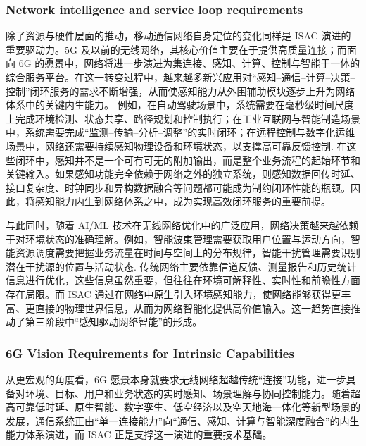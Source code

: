 \subsubsection{Network intelligence and service loop requirements}
\label{subsubsec:ch1-driving-force-network}

除了资源与硬件层面的推动，移动通信网络自身定位的变化同样是 ISAC 演进的重要驱动力。5G 及以前的无线网络，其核心价值主要在于提供高质量连接；而面向 6G 的愿景中，网络将进一步演进为集连接、感知、计算、控制与智能于一体的综合服务平台\cite{Gonzalez2024integrated,Saad2020Vision6G}。在这一转变过程中，越来越多新兴应用对“感知--通信--计算--决策--控制”闭环服务的需求不断增强，从而使感知能力从外围辅助模块逐步上升为网络体系中的关键内生能力。
例如，在自动驾驶场景中，系统需要在毫秒级时间尺度上完成环境检测、状态共享、路径规划和控制执行；在工业互联网与智能制造场景中，系统需要完成“监测--传输--分析--调整”的实时闭环；在远程控制与数字化运维场景中，网络还需要持续感知物理设备和环境状态，以支撑高可靠反馈控制\cite{Liu2022ISAC,Saad2020Vision6G}. 在这些闭环中，感知并不是一个可有可无的附加输出，而是整个业务流程的起始环节和关键输入。如果感知功能完全依赖于网络之外的独立系统，则感知数据回传时延、接口复杂度、时钟同步和异构数据融合等问题都可能成为制约闭环性能的瓶颈。因此，将感知能力内生到网络体系之中，成为实现高效闭环服务的重要前提。

与此同时，随着 AI/ML 技术在无线网络优化中的广泛应用，网络决策越来越依赖于对环境状态的准确理解。例如，智能波束管理需要获取用户位置与运动方向，智能资源调度需要把握业务流量在时间与空间上的分布规律，智能干扰管理需要识别潜在干扰源的位置与活动状态\cite{Saad2020Vision6G}. 传统网络主要依靠信道反馈、测量报告和历史统计信息进行优化，这些信息虽然重要，但往往在环境可解释性、实时性和前瞻性方面存在局限。而 ISAC 通过在网络中原生引入环境感知能力，使网络能够获得更丰富、更直接的物理世界信息，从而为网络智能化提供高价值输入。这一趋势直接推动了第三阶段中“感知驱动网络智能”的形成。

\subsubsection{6G Vision Requirements for Intrinsic Capabilities}
\label{subsubsec:ch1-driving-force-6g-vision}

从更宏观的角度看，6G 愿景本身就要求无线网络超越传统“连接”功能，进一步具备对环境、目标、用户和业务状态的实时感知、场景理解与协同控制能力\cite{Saad2020Vision6G,IMT2030Framework}。随着超高可靠低时延、原生智能、数字孪生、低空经济以及空天地海一体化等新型场景的发展，通信系统正由“单一连接能力”向“通信、感知、计算与智能深度融合”的内生能力体系演进，而 ISAC 正是支撑这一演进的重要技术基础\cite{Gonzalez2024integrated,Liu2022ISAC}。

